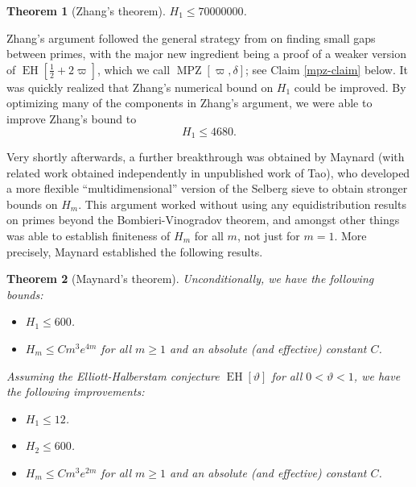 \documentclass{bmcart}
\DeclareMathOperator*\EH{EH}
\DeclareMathOperator*\MPZ{MPZ}
\theoremstyle{plain}
\newtheorem{theorem}{Theorem}[section]
\theoremstyle{definition}
\begin{document}
\begin{theorem}[Zhang's theorem]\label{zhang-thm}  $H_1 \leq \num{70000000}$.
\end{theorem}

Zhang's argument followed the general strategy from \cite{gpy} on finding small gaps between primes, with the major new ingredient being a proof of a weaker version of $\EH[\frac{1}{2}+2\varpi]$, which we call $\MPZ[\varpi,\delta]$; see Claim \ref{mpz-claim} below.  It was quickly realized that Zhang's numerical bound on $H_1$ could be improved.  By optimizing many of the components in Zhang's argument, we were able \cite{polymath8a, polymath8a-unabridged} to improve Zhang's bound to
$$ H_1 \leq \num{4680}.$$

Very shortly afterwards, a further breakthrough was obtained by Maynard \cite{maynard-new} (with related work obtained independently in unpublished work of Tao), who developed a more flexible ``multidimensional'' version of the Selberg sieve to obtain stronger bounds on $H_m$. This argument worked without using any equidistribution results on primes beyond the Bombieri-Vinogradov theorem, and amongst other things was able to establish finiteness of $H_m$ for all $m$, not just for $m=1$.  More precisely, Maynard established the following results.

\begin{theorem}[Maynard's theorem]  Unconditionally, we have the following bounds:
\begin{itemize}
\item[(i)] $H_1 \leq 600$.
\item[(ii)] $H_m \leq C m^3 e^{4m}$ for all $m \geq 1$ and an absolute (and effective) constant $C$.
\end{itemize}
Assuming the Elliott-Halberstam conjecture $\EH[\vartheta]$ for all $0 < \vartheta < 1$, we have the following improvements:
\begin{itemize}
\item[(iii)] $H_1 \leq 12$.
\item[(iv)] $H_2 \leq 600$.
\item[(v)] $H_m \leq C m^3 e^{2m}$ for all $m \geq 1$ and an absolute (and effective) constant $C$.
\end{itemize}
\end{theorem}
\end{document}
